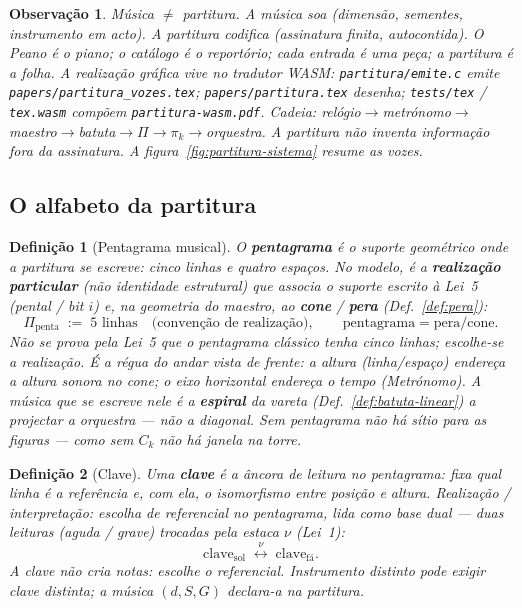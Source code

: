\documentclass[11pt,a4paper]{article}
\newtheorem{definicao}{Definição}
\newtheorem{observacao}{Observação}
\newcommand{\code}[1]{\texttt{#1}}
\begin{document}
\begin{observacao}
Música $\neq$ partitura. A música \emph{soa} (dimensão, sementes,
instrumento em acto). A partitura \emph{codifica} (assinatura finita,
autocontida). O Peano é o piano; o catálogo é o reportório; cada entrada
é uma peça; a partitura é a folha.
A realização gráfica vive no tradutor WASM:
\code{partitura/emite.c} emite \code{papers/partitura\_vozes.tex};
\code{papers/partitura.tex} desenha; \code{tests/tex} / \code{tex.wasm}
compõem \code{partitura-wasm.pdf}. Cadeia:
relógio$\to$metrónomo$\to$maestro$\to$batuta$\to\Pi\to\pi_k\to$orquestra.
A partitura não inventa informação fora da assinatura.
A figura~\ref{fig:partitura-sistema} resume as vozes.
\end{observacao}

\subsection*{O alfabeto da partitura}

\begin{definicao}[Pentagrama musical]\label{def:pentagrama}
O \textbf{pentagrama} é o suporte geométrico onde a partitura se escreve:
cinco linhas e quatro espaços. No modelo, é a
\textbf{realização particular} (não identidade estrutural) que associa
o suporte escrito à Lei~5 (pental / bit $i$) e, na geometria do maestro,
ao \textbf{cone} / \textbf{pera} (Def.~\ref{def:pera}):
\[
\Pi_{\mathrm{penta}}\;:=\;5\text{ linhas}
\quad\text{(convenção de realização)},
\qquad
\boxed{\text{pentagrama}=\text{pera}/\text{cone}}.
\]
Não se prova pela Lei~5 que o pentagrama clássico tenha cinco linhas;
escolhe-se a realização.
É a régua do andar vista de frente: a altura (linha/espaço) endereça a
altura sonora no cone; o eixo horizontal endereça o tempo (Metrónomo).
A música que se escreve nele é a \textbf{espiral} da vareta
(Def.~\ref{def:batuta-linear}) a projectar a orquestra --- não a
diagonal. Sem pentagrama não há sítio para as figuras --- como sem
$C_k$ não há janela na torre.
\end{definicao}

\begin{definicao}[Clave]\label{def:clave}
Uma \textbf{clave} é a âncora de leitura no pentagrama: fixa qual linha
é a referência e, com ela, o isomorfismo entre posição e altura.
\emph{Realização / interpretação:} escolha de referencial no
pentagrama, lida como base dual --- duas leituras (aguda / grave)
trocadas pela estaca $\nu$ (Lei~1):
\[
\mathrm{clave}_{\mathrm{sol}}
\;\overset{\nu}{\longleftrightarrow}\;
\mathrm{clave}_{\mathrm{fá}}.
\]
A clave não cria notas: escolhe o referencial. Instrumento distinto
pode exigir clave distinta; a música $(d,S,G)$ declara-a na partitura.
\end{definicao}
\end{document}
